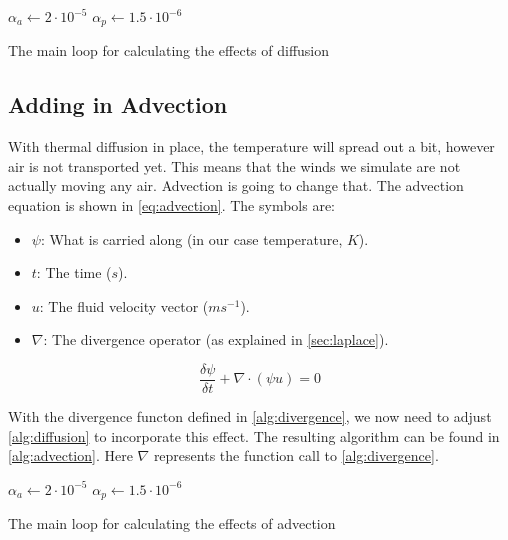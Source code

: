 \begin{algorithm}
    $\alpha_a \leftarrow 2 \cdot 10^{-5}$ \;
    $\alpha_p \leftarrow 1.5 \cdot 10^{-6}$ \;
    \caption{The main loop for calculating the effects of diffusion}
    \label{alg:diffusion}
\end{algorithm}

\subsection{Adding in Advection}
With thermal diffusion in place, the temperature will spread out a bit, however air is not transported yet. This means that the winds we simulate are not actually moving any air. Advection is
going to change that. The advection equation is shown in \autoref{eq:advection}. The symbols are:

\begin{itemize}
    \item $\psi$: What is carried along (in our case temperature, $K$).
    \item $t$: The time ($s$).
    \item $u$: The fluid velocity vector ($ms^{-1}$).
    \item $\nabla$: The divergence operator (as explained in \autoref{sec:laplace}).
\end{itemize}

\begin{equation}
    \frac{\delta \psi}{\delta t} + \nabla \cdot (\psi u) = 0
    \label{eq:advection}
\end{equation}

With the divergence functon defined in \autoref{alg:divergence}, we now need to adjust \autoref{alg:diffusion} to incorporate this effect. The resulting algorithm can be found in 
\autoref{alg:advection}. Here $\nabla$ represents the function call to \autoref{alg:divergence}.

\begin{algorithm}
    $\alpha_a \leftarrow 2 \cdot 10^{-5}$ \;
    $\alpha_p \leftarrow 1.5 \cdot 10^{-6}$ \;
    \caption{The main loop for calculating the effects of advection}
    \label{alg:advection}
\end{algorithm}

